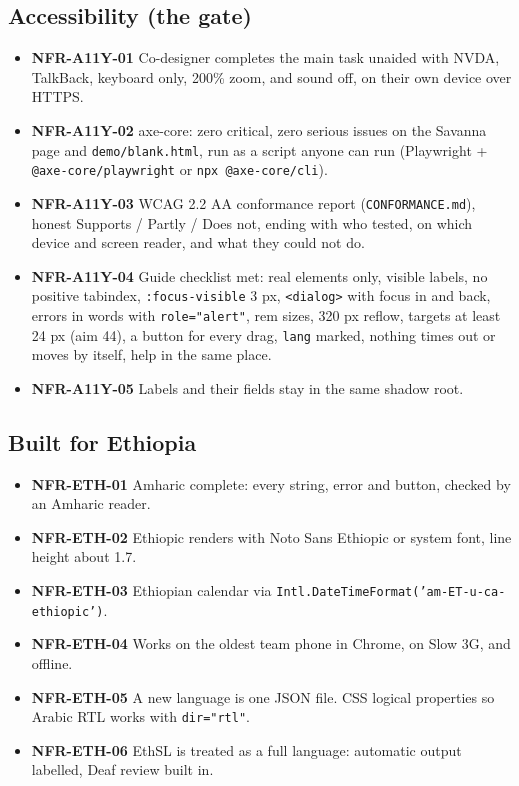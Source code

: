 \documentclass[11pt,a4paper]{article}
\newcommand{\code}[1]{\texttt{#1}}
\newcommand{\req}[1]{\textbf{#1}}
\begin{document}
\subsection{Accessibility (the gate)}
\begin{itemize}
  \item \req{NFR-A11Y-01} Co-designer completes the main task unaided with NVDA, TalkBack, keyboard only, 200\% zoom, and sound off, on their own device over HTTPS.
  \item \req{NFR-A11Y-02} axe-core: zero critical, zero serious issues on the Savanna page and \code{demo/blank.html}, run as a script anyone can run (Playwright + \code{@axe-core/playwright} or \code{npx @axe-core/cli}).
  \item \req{NFR-A11Y-03} WCAG 2.2 AA conformance report (\code{CONFORMANCE.md}), honest Supports / Partly / Does not, ending with who tested, on which device and screen reader, and what they could not do.
  \item \req{NFR-A11Y-04} Guide checklist met: real elements only, visible labels, no positive tabindex, \code{:focus-visible} 3 px, \code{<dialog>} with focus in and back, errors in words with \code{role="alert"}, rem sizes, 320 px reflow, targets at least 24 px (aim 44), a button for every drag, \code{lang} marked, nothing times out or moves by itself, help in the same place.
  \item \req{NFR-A11Y-05} Labels and their fields stay in the same shadow root.
\end{itemize}

\subsection{Built for Ethiopia}
\begin{itemize}
  \item \req{NFR-ETH-01} Amharic complete: every string, error and button, checked by an Amharic reader.
  \item \req{NFR-ETH-02} Ethiopic renders with Noto Sans Ethiopic or system font, line height about 1.7.
  \item \req{NFR-ETH-03} Ethiopian calendar via \code{Intl.DateTimeFormat('am-ET-u-ca-ethiopic')}.
  \item \req{NFR-ETH-04} Works on the oldest team phone in Chrome, on Slow 3G, and offline.
  \item \req{NFR-ETH-05} A new language is one JSON file. CSS logical properties so Arabic RTL works with \code{dir="rtl"}.
  \item \req{NFR-ETH-06} EthSL is treated as a full language: automatic output labelled, Deaf review built in.
\end{itemize}
\end{document}
